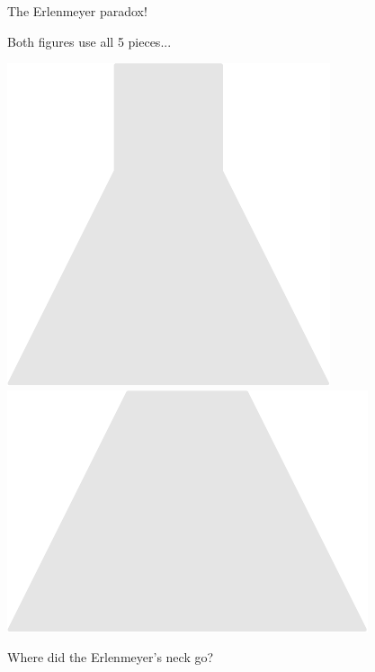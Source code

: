 \documentclass[14pt]{beamer}
\begin{document}
    \begin{frame}{The Erlenmeyer paradox!}
        \begin{center}
            Both figures use all 5 pieces...

            \bigskip\bigskip

            \includegraphics[scale=0.5]{figures/figure022u.pdf}\qquad
            \qquad
            \includegraphics[scale=0.5]{figures/figure022i.pdf}

            \bigskip\bigskip

            Where did the Erlenmeyer's neck go? 
        \end{center}
    \end{frame}
\end{document}
